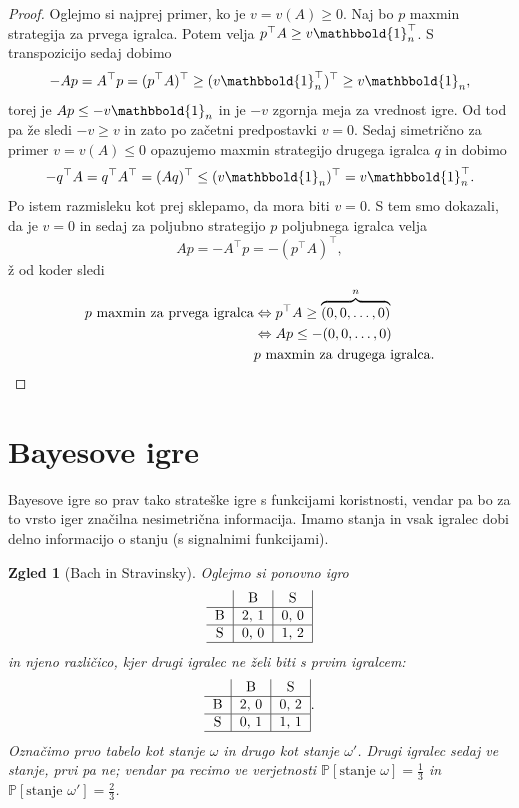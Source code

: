 \documentclass[10pt, a4paper]{article}
\newtheorem{zgled}[izr]{Zgled}
\newenvironment{noticeC}{%
  \tcolorbox[%
  notitle,
  empty,
  enhanced,  %
  breakable,
  coltext=black, 
  fontupper=\rmfamily,
  parbox=false,
  noparskip,
  sharp corners,
  boxrule=-1pt,  %
  frame hidden,
  left=7pt,  %
  right=7pt,
  top=5pt,
  bottom=5pt,
  before skip=2.5ex plus 2pt,
  after skip=2.5ex plus 2pt,
  overlay unbroken and last={%
  },
  ]}
{\endtcolorbox}
\newenvironment{dokaz}%
  {\begin{noticeC}\begin{proof}}%
  {\end{proof}\end{noticeC}}
\newcommand{\prob}{\mathbb{P}}
\begin{document}
\begin{dokaz}
  Oglejmo si najprej primer, ko je $v = v(A) \geq 0$.
  Naj bo $p$ maxmin strategija za prvega igralca. 
  Potem velja $p^\top A \geq v \mathbbold{1}_n^\top$.
  S transpozicijo sedaj dobimo 
  $$-Ap = A^\top p = (p^\top A)^\top \geq (v \mathbbold{1}_n ^\top)^\top \geq v \mathbbold{1}_n,$$
  torej je $Ap \leq - v\mathbbold{1}_n$ in je $-v$ zgornja 
  meja za vrednost igre. Od tod pa že sledi $-v \geq v$ in zato po začetni predpostavki $v = 0$.
  Sedaj simetrično za primer $v = v(A) \leq 0$ opazujemo maxmin 
  strategijo drugega igralca $q$ in dobimo 
  $$-q^\top A = q^\top A^\top = (A q)^\top \leq (v \mathbbold{1}_n)^\top = v \mathbbold{1}_n^\top.$$
  Po istem razmisleku kot prej sklepamo, da mora biti $v = 0$.
  S tem smo dokazali, da je $v = 0$ in sedaj za poljubno strategijo $p$ poljubnega igralca velja 
  $$A p = - A^\top p = -(p^\top A)^\top,$$ž
  od koder sledi 
  \begin{align*}
    \text{$p$ maxmin za prvega igralca} &\Leftrightarrow p^\top A \geq \overbrace{(0, 0, \dots, 0)}^{n}\\
    &\Leftrightarrow A p \leq -(0, 0, \dots, 0)\\
    & \text{$p$ maxmin za drugega igralca}. \qedhere
  \end{align*}
\end{dokaz}

\section{Bayesove igre}

Bayesove igre so prav tako strateške igre s funkcijami koristnosti, vendar pa bo za to vrsto iger značilna nesimetrična informacija.
Imamo stanja in vsak igralec dobi delno informacijo o stanju (s signalnimi funkcijami).

\begin{zgled}[Bach in Stravinsky]
  Oglejmo si ponovno igro
  $${\begin{tabular}{c|c|c|}
    & B & S\\
    \hline
    B & 2, 1 & 0, 0\\
    \hline
    S & 0, 0 & 1, 2\\
    \hline
\end{tabular}}$$
in njeno različico, kjer drugi igralec ne želi biti s prvim igralcem:
$${\begin{tabular}{c|c|c|}
  & B & S\\
  \hline
  B & 2, 0 & 0, 2\\
  \hline
  S & 0, 1 & 1, 1\\
  \hline
\end{tabular}}.$$
Označimo prvo tabelo kot stanje $\omega$ in drugo kot stanje $\omega'$.
Drugi igralec sedaj ve stanje, prvi pa ne; vendar pa recimo ve verjetnosti $\prob[\text{stanje $\omega$}] = \frac{1}{3}$
in $\prob[\text{stanje $\omega'$}] = \frac{2}{3}$.
\end{zgled}
\end{document}
